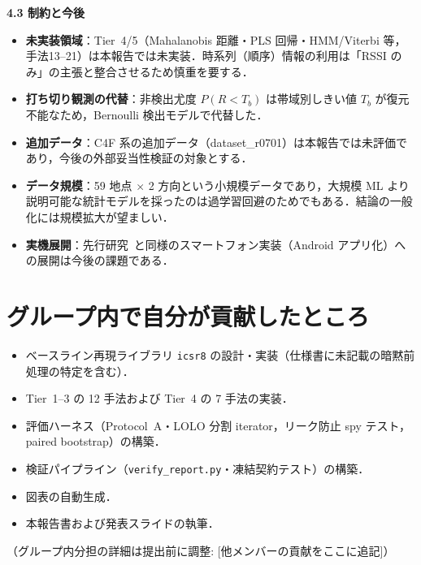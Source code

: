 \documentclass[a4paper,twocolumn]{ltjsarticle}
\begin{document}
\smallskip\noindent\textbf{4.3\; 制約と今後}\;
\begin{itemize}
  \item \textbf{未実装領域}：Tier~4/5（Mahalanobis 距離・PLS 回帰・HMM/Viterbi 等，手法13--21）は本報告では未実装．時系列（順序）情報の利用は「RSSI のみ」の主張と整合させるため慎重を要する．
  \item \textbf{打ち切り観測の代替}：非検出尤度 $P(R<T_b)$ は帯域別しきい値 $T_b$ が復元不能なため，Bernoulli 検出モデルで代替した．
  \item \textbf{追加データ}：C4F 系の追加データ（dataset\_r0701）は本報告では未評価であり，今後の外部妥当性検証の対象とする．
  \item \textbf{データ規模}：59 地点 $\times$ 2 方向という小規模データであり，大規模 ML より説明可能な統計モデルを採ったのは過学習回避のためでもある．結論の一般化には規模拡大が望ましい．
  \item \textbf{実機展開}：先行研究~\cite{tanaka2023tut}と同様のスマートフォン実装（Android アプリ化）への展開は今後の課題である．
\end{itemize}

\section{グループ内で自分が貢献したところ}

\begin{itemize}
  \item ベースライン再現ライブラリ \texttt{icsr8} の設計・実装（仕様書に未記載の暗黙前処理の特定を含む）．
  \item Tier~1--3 の 12 手法および Tier~4 の 7 手法の実装．
  \item 評価ハーネス（Protocol~A・LOLO 分割 iterator，リーク防止 spy テスト，paired bootstrap）の構築．
  \item 検証パイプライン（\texttt{verify\_report.py}・凍結契約テスト）の構築．
  \item 図表の自動生成．
  \item 本報告書および発表スライドの執筆．
\end{itemize}
（グループ内分担の詳細は提出前に調整: [他メンバーの貢献をここに追記]）
\end{document}
